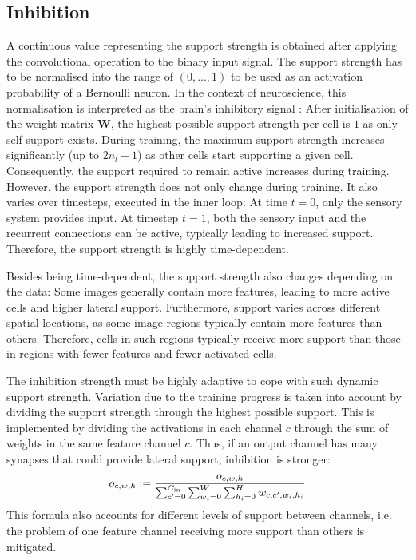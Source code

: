 \subsection{Inhibition}
A continuous value representing the support strength is obtained after applying the convolutional operation to the binary input signal.
The support strength has to be normalised into the range of $(0, ..., 1)$ to be used as an activation probability of a Bernoulli neuron.
In the context of neuroscience, this normalisation is interpreted as the brain's inhibitory signal :
After initialisation of the weight matrix $\boldsymbol{W}$, the highest possible support strength per cell is $1$ as only self-support exists. During training, the maximum support strength increases significantly (up to $2n_l + 1$) as other cells start supporting a given cell.
Consequently, the support required to remain active increases during training.
However, the support strength does not only change during training. It also varies over timesteps, executed in the inner loop: At time $t=0$, only the sensory system provides input. At timestep $t=1$, both the sensory input and the recurrent connections can be active, typically leading to increased support. Therefore, the support strength is highly time-dependent.

Besides being time-dependent, the support strength also changes depending on the data:
Some images generally contain more features, leading to more active cells and higher lateral support. Furthermore, support varies across different spatial locations, as some image regions typically contain more features than others. Therefore, cells in such regions typically receive more support than those in regions with fewer features and fewer activated cells.

The inhibition strength must be highly adaptive to cope with such dynamic support strength.
Variation due to the training progress is taken into account by dividing the support strength through the highest possible support. This is implemented by dividing the activations in each channel $c$ through the sum of weights in the same feature channel $c$. Thus, if an output channel has many synapses that could provide lateral support, inhibition is stronger:
%
\begin{align}\eqlbl{norm_1}
    o_{c,w,h} := \frac{o_{c,w,h}}{\sum_{c'=0}^{C_{\text{in}}} \sum_{w_i=0}^{W} \sum_{h_i=0}^{H} w_{c, c',w_i,h_i}}
\end{align}
%
This formula also accounts for different levels of support between channels, i.e. the problem of one feature channel receiving more support than others is mitigated.


